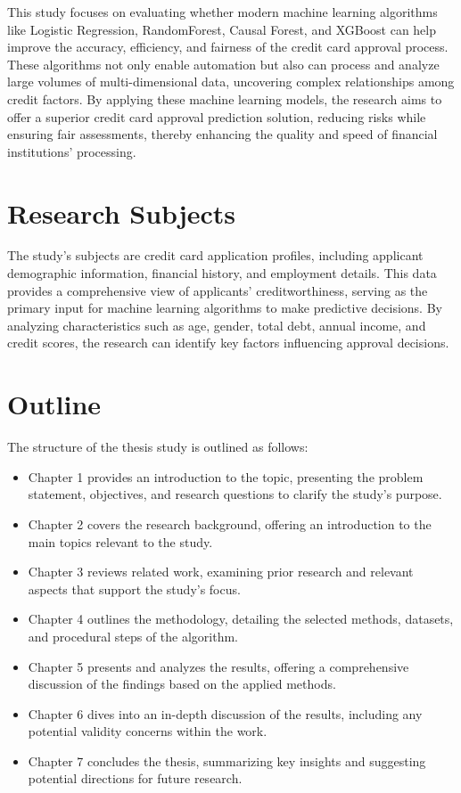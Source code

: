 \documentclass[12pt]{report}
\begin{document}
    This study focuses on evaluating whether modern machine learning algorithms like Logistic Regression, RandomForest, Causal Forest, and XGBoost can help improve the accuracy, efficiency, and fairness of the credit card approval process. These algorithms not only enable automation but also can process and analyze large volumes of multi-dimensional data, uncovering complex relationships among credit factors. By applying these machine learning models, the research aims to offer a superior credit card approval prediction solution, reducing risks while ensuring fair assessments, thereby enhancing the quality and speed of financial institutions' processing.

    \section{Research Subjects}
    The study's subjects are credit card application profiles, including applicant demographic information, financial history, and employment details. This data provides a comprehensive view of applicants' creditworthiness, serving as the primary input for machine learning algorithms to make predictive decisions. By analyzing characteristics such as age, gender, total debt, annual income, and credit scores, the research can identify key factors influencing approval decisions.

    \section{Outline}

    The structure of the thesis study is outlined as follows:
    \begin{itemize}
        \item Chapter 1 provides an introduction to the topic, presenting the problem statement, objectives, and research questions to clarify the study’s purpose.
        \item Chapter 2 covers the research background, offering an introduction to the main topics relevant to the study.
        \item Chapter 3 reviews related work, examining prior research and relevant aspects that support the study’s focus.
        \item Chapter 4 outlines the methodology, detailing the selected methods, datasets, and procedural steps of the algorithm.
        \item Chapter 5 presents and analyzes the results, offering a comprehensive discussion of the findings based on the applied methods.
        \item Chapter 6 dives into an in-depth discussion of the results, including any potential validity concerns within the work.
        \item Chapter 7 concludes the thesis, summarizing key insights and suggesting potential directions for future research.
    \end{itemize}
\end{document}
